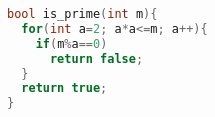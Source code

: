 \begin{lstlisting}[language=C++]
bool is_prime(int m){
  for(int a=2; a*a<=m; a++){
    if(m%a==0)
      return false;
  }
  return true;
}
\end{lstlisting}